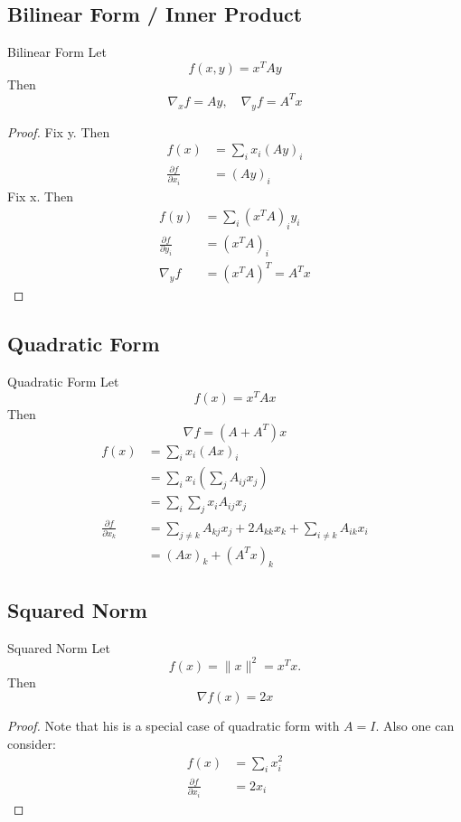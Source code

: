 \documentclass[../main]{subfiles}
\begin{document}
\subsection{Bilinear Form / Inner Product}

\begin{bbox}{Bilinear Form}
    Let 
    \[
    f(x, y) = x^T A y
    \]
    Then 
    \[
    \nabla_x f = Ay, \quad \nabla_y f = A^T x
    \]
    \begin{proof}
        Fix y. Then 
        \begin{align*}
            f(x) &= \sum_i x_i (Ay)_i\\
            \frac{\partial f}{\partial x_i} &= (Ay)_i
        \end{align*}
        Fix x. Then 
        \begin{align*}
            f(y) &= \sum_i (x^T A)_i y_i\\
            \frac{\partial f}{\partial y_i} &= (x^T A)_i\\
            \nabla_y f&= (x^TA)^T = A^T x
        \end{align*}
    \end{proof}
\end{bbox}
\subsection{Quadratic Form}
\begin{bbox}{Quadratic Form}
     Let 
    \[
    f(x) = x^T A x
    \]
    Then 
    \[
    \nabla f = (A+A^T)x
    \]
    \begin{align*}
            f(x) &= \sum_i x_i (Ax)_i\\
            &= \sum_i x_i (\sum_{j}A_{ij}x_j)\\
            &= \sum_i\sum_{j}x_{i}A_{ij}x_j\\
            \frac{\partial f}{\partial x_k} &= \sum_{j\neq k}A_{kj}x_j + 2A_{kk}x_{k} + \sum_{i\neq k}A_{ik}x_{i}\\
            &= (Ax)_k + (A^Tx)_k
        \end{align*}
\end{bbox}

\subsection{Squared Norm}
\begin{bbox}{Squared Norm}
    Let 
    \[
    f(x) = \|x\|^2 = x^T x.
    \]
    Then
    \[
    \nabla f (x) = 2x
    \]
    \begin{proof}
        Note that his is a special case of quadratic form with $A = I$. Also one can consider:
        \begin{align*}
        f(x) &= \sum_{i}x_i^2\\
        \frac{\partial f}{\partial x_i} &= 2x_i
    \end{align*}
    \end{proof}
    
\end{bbox}
\end{document}
